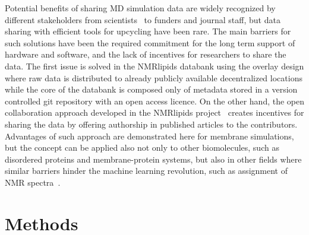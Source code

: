 \documentclass[fleqn,10pt]{wlscirep}
\begin{document}
Potential benefits of sharing MD simulation data are widely recognized by different stakeholders from scientists~\cite{feig99,tai04,silva06,abraham19,hildebrand19,hospital20,abriata20,espigares20} to funders and journal staff, but data sharing with efficient tools for upcycling have been rare. The main barriers for such solutions have been the required commitment for the long term support of hardware and software, and the lack of incentives for researchers to share the data. The first issue is solved in the NMRlipids databank using the overlay design where raw data is distributed to already publicly available decentralized locations while the core of the databank is composed only of metadata stored in a version controlled git repository with an open access licence. On the other hand, the open collaboration approach developed in the NMRlipids project~\cite{botan15} creates incentives for sharing the data by offering authorship in published articles to the contributors. Advantages of such approach are demonstrated here for membrane simulations, but the concept can be applied also not only to other biomolecules, such as disordered proteins and membrane-protein systems, but also in other fields where similar barriers hinder the machine learning revolution, such as assignment of NMR spectra~\cite{klukowski22}. 



\newpage


\section{Methods}

\end{document}
